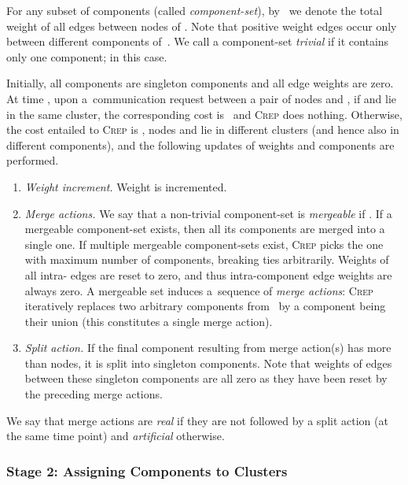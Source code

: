 \documentclass{siamart190516}
\newcommand{\CREP}{\textsc{Crep}\xspace}
\begin{document}
For any subset of components  (called
\emph{component-set}), by~ we denote the total weight of all edges
between nodes of . Note that positive weight edges occur only between
different components of~. We call a component-set \emph{trivial} if it
contains only one component;  in this case.

Initially, all components are singleton components and all edge weights are
zero. At time , upon a~communication request between a pair of nodes 
and , if  and  lie in the same cluster, the corresponding cost is~
and \CREP does nothing. Otherwise, the cost entailed to \CREP is , nodes
 and  lie in different clusters (and hence also in different
components), and the following updates of weights and components are
performed.

\begin{enumerate}

\item \emph{Weight increment.} Weight  is incremented.

\item \emph{Merge actions.} We say that a non-trivial component-set  is \emph{mergeable} if . If a mergeable component-set  exists, then all its
components are merged into a single one. If multiple mergeable component-sets
exist, \CREP picks the one with maximum number of components, breaking ties
arbitrarily. Weights of all intra- edges are reset to zero, and thus
intra-component edge weights are always zero. A mergeable set  induces
a~sequence of  \emph{merge actions}:
\CREP iteratively replaces two arbitrary components 
from~ by a component being their union (this constitutes a single merge
action).

\item \emph{Split action.} If the final component resulting from merge action(s)
has more than  nodes, it is split into singleton
components. Note that weights of edges between these singleton components are
all zero as they have been reset by the preceding merge actions.

\end{enumerate}

We say that merge actions are \emph{real} if they are not followed
by a split action (at the same time point) and \emph{artificial} otherwise. 



\subsubsection{Stage 2: Assigning Components to Clusters}
\end{document}
